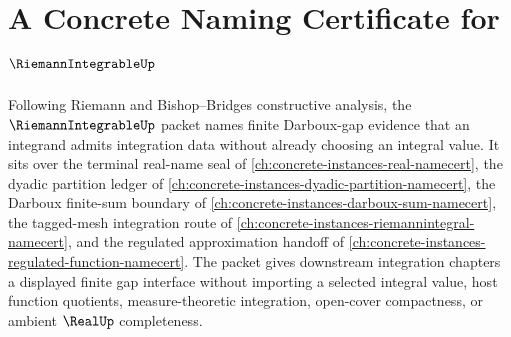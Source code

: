 \chapter{A Concrete Naming Certificate for $\RiemannIntegrableUp$}
\label{ch:concrete-instances-riemann-integrable-namecert}

Following Riemann and Bishop--Bridges constructive analysis, the $\RiemannIntegrableUp$ packet names finite Darboux-gap evidence that an integrand admits integration data without already choosing an integral value. It sits over the terminal real-name seal of \autoref{ch:concrete-instances-real-namecert}, the dyadic partition ledger of \autoref{ch:concrete-instances-dyadic-partition-namecert}, the Darboux finite-sum boundary of \autoref{ch:concrete-instances-darboux-sum-namecert}, the tagged-mesh integration route of \autoref{ch:concrete-instances-riemannintegral-namecert}, and the regulated approximation handoff of \autoref{ch:concrete-instances-regulated-function-namecert}. The packet gives downstream integration chapters a displayed finite gap interface without importing a selected integral value, host function quotients, measure-theoretic integration, open-cover compactness, or ambient $\RealUp$ completeness.


